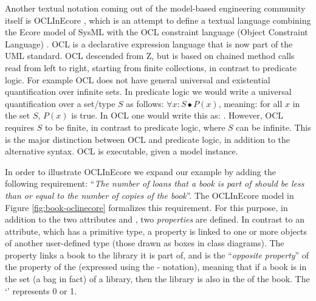 Another textual notation coming out of the model-based engineering community itself is OCLInEcore \cite{?}, 
which is an attempt 
to define a textual language combining the Ecore model
of SysML with the OCL constraint language (Object Constraint 
Language) 
\cite{?}. OCL is a declarative expression language that is now 
part of the UML 
standard. OCL descended from Z, but is based on chained method 
calls read from left to right, starting from finite collections, 
in contrast to predicate logic. For example OCL does not have
general universal and existential quantification over infinite 
sets. In predicate 
logic we would write a universal quantification over a set/type 
$S$ as follows: $\forall x : S \bullet P(x)$, meaning: for all $x$ in the set $S$, $P(x)$ is true. In OCL one would 
write this as:
. However, OCL requires $S$ to be 
finite,
in contrast to predicate logic, where $S$ can be infinite. This
is the major distinction between OCL and predicate logic, in 
addition to the alternative syntax. OCL is executable, given
a model instance.



%   

In order to illustrate OCLInEcore we expand our example by adding 
the following requirement: ``{\em The number of loans that a book 
is part of should be less than or equal to the 
number of copies of the book}''. The OCLInEcore model 
in Figure \ref{fig:book-oclinecore} formalizes this requirement.
For this purpose, in addition to the two attributes  and , two {\em properties} are defined. 
In contrast to an attribute, 
which has a primitive type, a property is linked to one or 
more objects of another user-defined 
type (those drawn as boxes in class diagrams).
The property  links a book to the library it is part 
of, and is the ``{\em opposite property}'' of the  
property of the  (expressed using the \iocl{#}-
notation), meaning that if a book is in the  set (a 
bag in fact) of a library, then the library is also in the 
 of the book. The `' represents 0 or 1.

